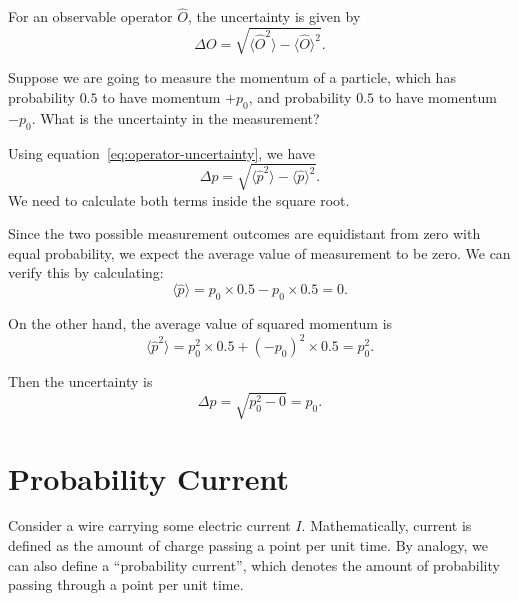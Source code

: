 \documentclass[../quantum_mechanics.tex]{subfiles}
\begin{document}
        \begin{definition}
            For an observable operator $\hat{O}$, the uncertainty is given by
            \begin{equation}\label{eq:operator-uncertainty}
                \Delta O=\sqrt{\langle\hat{O}^2\rangle-\langle\hat{O}\rangle^2}.
            \end{equation}
        \end{definition}

        \begin{example}
            Suppose we are going to measure the momentum of a particle, which has probability $0.5$ to have momentum $+p_0$, and probability $0.5$ to have momentum $-p_0$.
            What is the uncertainty in the measurement?

            Using equation~\ref{eq:operator-uncertainty}, we have
            \begin{equation}
                \Delta p=\sqrt{\langle\hat{p}^2\rangle-\langle\hat{p}\rangle^2}.
            \end{equation}
            We need to calculate both terms inside the square root.

            Since the two possible measurement outcomes are equidistant from zero with equal probability, we expect the average value of measurement to be zero.
            We can verify this by calculating:
            \begin{equation}
                \langle\hat{p}\rangle=p_0\times 0.5-p_0\times 0.5=0.
            \end{equation}

            On the other hand, the average value of squared momentum is
            \begin{equation}
                \langle\hat{p}^2\rangle=p_0^2\times 0.5+(-p_0)^2\times 0.5=p_0^2.
            \end{equation}

            Then the uncertainty is
            \begin{equation}
                \Delta p=\sqrt{p_0^2-0}=p_0.
            \end{equation}
        \end{example}

    \section{Probability Current}\label{sec:probability-current}
        Consider a wire carrying some electric current $I$.
        Mathematically, current is defined as the amount of charge passing a point per unit time.
        By analogy, we can also define a ``probability current'', which denotes the amount of probability passing through a point per unit time.
\end{document}
